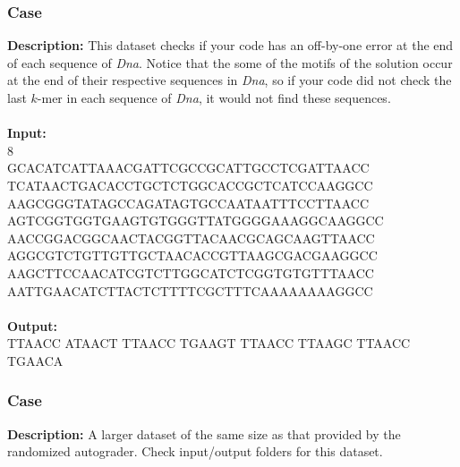\documentclass{article}
\newcommand{\code}[1]{{\fontfamily{pcr}\selectfont #1}}
\begin{document}
\subsubsection*{Case }
\hline \vspace{5}
\textbf{Description:} This dataset checks if your code has an off-by-one error at the end of each sequence of \emph{Dna}. Notice that the some of the motifs of the solution occur at the end of their respective sequences in \emph{Dna}, so if your code did not check the last $k$-mer in each sequence of \emph{Dna}, it would not find these sequences.\\ \\
\noindent \textbf{Input:}\\
\code{6 8\\GCACATCATTAAACGATTCGCCGCATTGCCTCGATTAACC\\TCATAACTGACACCTGCTCTGGCACCGCTCATCCAAGGCC\\AAGCGGGTATAGCCAGATAGTGCCAATAATTTCCTTAACC\\AGTCGGTGGTGAAGTGTGGGTTATGGGGAAAGGCAAGGCC\\AACCGGACGGCAACTACGGTTACAACGCAGCAAGTTAACC\\AGGCGTCTGTTGTTGCTAACACCGTTAAGCGACGAAGGCC\\AAGCTTCCAACATCGTCTTGGCATCTCGGTGTGTTTAACC\\AATTGAACATCTTACTCTTTTCGCTTTCAAAAAAAAGGCC}\\ \\
\noindent \textbf{Output:}\\
\code{TTAACC ATAACT TTAACC TGAAGT TTAACC TTAAGC TTAACC TGAACA}

\subsubsection*{Case }
\hline \vspace{5}
\textbf{Description:} A larger dataset of the same size as that provided by the randomized autograder. Check input/output folders for this dataset.\\ \\
\pagebreak
\end{document}
